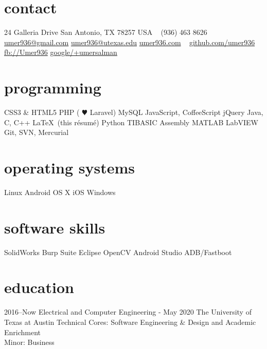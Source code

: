 \documentclass[]{friggeri-cv} %
\begin{document}


\begin{aside} %
	\section{contact}
	24 Galleria Drive
	San Antonio, TX 78257
	USA
	~
	(936) 463 8626
	~
	\href{mailto:umer936@gmail.com}{umer936@gmail.com}
	\href{mailto:umer936@utexas.edu}{umer936@utexas.edu}
	\href{http://umer936.com}{umer936.com}
	~
	\href{http://github.com/umer936}{github.com/umer936}
	\href{http://facebook.com/Umer936}{fb://Umer936}
	\href{http://google.com/+umersalman}{google/+umersalman}
	~
	\section{programming}
	CSS3 \& HTML5
	PHP ({\color{red} $\varheartsuit$} Laravel)
	MySQL
	JavaScript, CoffeeScript
	jQuery
	Java, C, C++
	\LaTeX \ (this r\'esum\'e)
	Python
	TIBASIC
	Assembly
	MATLAB
	LabVIEW
	Git, SVN, Mercurial
	~
	\section{operating systems}
	Linux
	Android
	OS X
	iOS
	Windows
	~
	\section{software skills}
	SolidWorks
	Burp Suite
	Eclipse
	OpenCV
	Android Studio
	ADB/Fastboot
\end{aside}


\section{education}
\vspace{-7pt}

\begin{entrylist}

	\entry
	{2016--Now}
	{Electrical and Computer Engineering - May 2020}
	{The University of Texas at Austin}
	{
		Technical Cores: Software Engineering \& Design and Academic Enrichment \\
		Minor: Business
	}

\end{entrylist}
\end{document}

